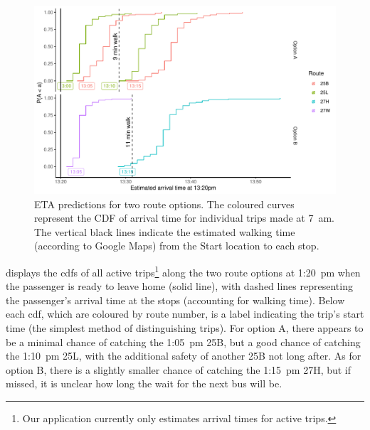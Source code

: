 \begin{knitrout}\small
{}\color{fgcolor}\begin{figure}

{\centering \includegraphics[width=\textwidth]{figure/eta_journey_arrival-1} 

}

\caption[ETA predictions for two route options]{ETA predictions for two route options. The coloured curves represent the CDF of arrival time for individual trips made at 7~am. The vertical black lines indicate the estimated walking time (according to Google Maps) from the Start location to each stop.}\label{fig:eta_journey_arrival}
\end{figure}


\end{knitrout}



 displays the \glspl{cdf} of all active trips\footnote{Our application currently only estimates arrival times for active trips.} along the two route options at  1:20~pm when the passenger is ready to leave home (solid line), with dashed lines representing the passenger's arrival time at the stops (accounting for walking time). Below each \gls{cdf}, which are coloured by route number, is a label indicating the trip's start time (the simplest method of distinguishing trips). For option A, there appears to be a minimal chance of catching the 1:05~pm 25B, but a good chance of catching the 1:10~pm 25L, with the additional safety of another 25B not long after. As for option B, there is a slightly smaller chance of catching the 1:15~pm 27H, but if missed, it is unclear how long the wait for the next bus will be.


